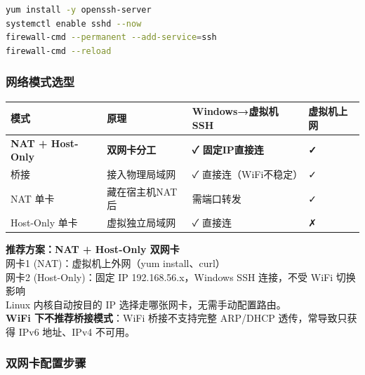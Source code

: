 \documentclass[12pt,a4paper]{ctexart}
\begin{document}
\begin{cmdbox}
\small
\begin{lstlisting}[language=bash,numbers=none]
yum install -y openssh-server
systemctl enable sshd --now
firewall-cmd --permanent --add-service=ssh
firewall-cmd --reload
\end{lstlisting}
\end{cmdbox}

\subsubsection{网络模式选型}

\begin{table}[h]
\centering
\begin{tabular}{p{2.2cm}p{4cm}p{3.5cm}p{3.5cm}}
\toprule
模式       & 原理 & Windows→虚拟机SSH & 虚拟机上网 \\
\midrule
\textbf{NAT + Host-Only} & \textbf{双网卡分工} & \textbf{✓ 固定IP直接连} & \textbf{✓} \\
桥接       & 接入物理局域网  & ✓ 直接连（WiFi不稳定） & ✓ \\
NAT 单卡   & 藏在宿主机NAT后 & 需端口转发 & ✓ \\
Host-Only 单卡 & 虚拟独立局域网  & ✓ 直接连 & ✗ \\
\bottomrule
\end{tabular}
\end{table}

\begin{infobox}
  \textbf{推荐方案：NAT + Host-Only 双网卡} \\
  网卡1 (NAT)：虚拟机上外网（yum install、curl） \\
  网卡2 (Host-Only)：固定 IP 192.168.56.x，Windows SSH 连接，不受 WiFi 切换影响 \\
  Linux 内核自动按目的 IP 选择走哪张网卡，无需手动配置路由。 \\
  \textbf{WiFi 下不推荐桥接模式}：WiFi 桥接不支持完整 ARP/DHCP 透传，常导致只获得 IPv6 地址、IPv4 不可用。
\end{infobox}

\subsubsection{双网卡配置步骤}
\end{document}
